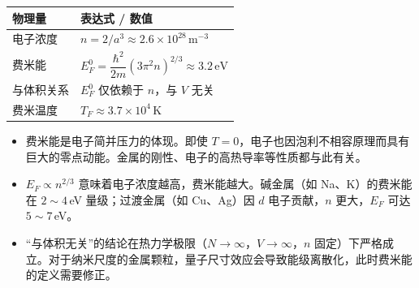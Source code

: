 \begin{formulabox}[答案汇总]
\begin{center}
\begin{tabular}{ll}
\toprule
\textbf{物理量} & \textbf{表达式 / 数值} \\
\midrule
电子浓度 & $n=2/a^3\approx2.6\times10^{28}\,\text{m}^{-3}$ \\
费米能 & $E_F^0=\dfrac{\hbar^2}{2m}(3\pi^2n)^{2/3}\approx3.2\,\text{eV}$ \\
与体积关系 & $E_F^0$ 仅依赖于 $n$，与 $V$ 无关 \\
费米温度 & $T_F\approx3.7\times10^4\,\text{K}$ \\
\bottomrule
\end{tabular}
\end{center}
\end{formulabox}

\begin{insightbox}[物理图像]
\begin{itemize}
    \item 费米能是电子简并压力的体现。即使 $T=0$，电子也因泡利不相容原理而具有巨大的零点动能。金属的刚性、电子的高热导率等性质都与此有关。
    \item $E_F\propto n^{2/3}$ 意味着电子浓度越高，费米能越大。碱金属（如 Na、K）的费米能在 $2\!\sim\!4\,$eV 量级；过渡金属（如 Cu、Ag）因 $d$ 电子贡献，$n$ 更大，$E_F$ 可达 $5\!\sim\!7\,$eV。
    \item ``与体积无关''的结论在热力学极限（$N\to\infty$，$V\to\infty$，$n$ 固定）下严格成立。对于纳米尺度的金属颗粒，量子尺寸效应会导致能级离散化，此时费米能的定义需要修正。
\end{itemize}
\end{insightbox}
